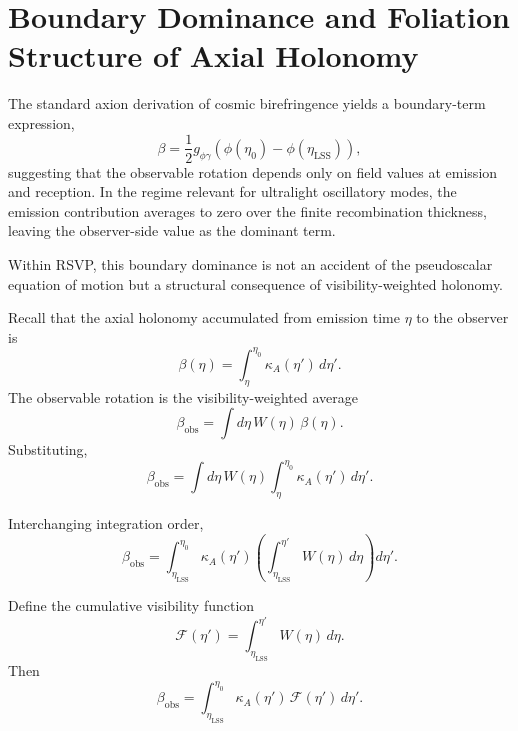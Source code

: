\documentclass[12pt]{article}
\begin{document}
\newpage
\section{Boundary Dominance and Foliation Structure of Axial Holonomy}

The standard axion derivation of cosmic birefringence yields a boundary-term expression,
\begin{equation}
\beta
=
\frac{1}{2} g_{\phi\gamma}
\left(
\phi(\eta_0) - \phi(\eta_{\mathrm{LSS}})
\right),
\end{equation}
suggesting that the observable rotation depends only on field values at emission and reception. In the regime relevant for ultralight oscillatory modes, the emission contribution averages to zero over the finite recombination thickness, leaving the observer-side value as the dominant term.

Within RSVP, this boundary dominance is not an accident of the pseudoscalar equation of motion but a structural consequence of visibility-weighted holonomy.

Recall that the axial holonomy accumulated from emission time $\eta$ to the observer is
\begin{equation}
\beta(\eta)
=
\int_{\eta}^{\eta_0}
\kappa_A(\eta')\, d\eta'.
\end{equation}
The observable rotation is the visibility-weighted average
\begin{equation}
\beta_{\mathrm{obs}}
=
\int d\eta\, W(\eta)\, \beta(\eta).
\end{equation}
Substituting,
\begin{equation}
\beta_{\mathrm{obs}}
=
\int d\eta\, W(\eta)
\int_{\eta}^{\eta_0}
\kappa_A(\eta')\, d\eta'.
\end{equation}

Interchanging integration order,
\begin{equation}
\beta_{\mathrm{obs}}
=
\int_{\eta_{\mathrm{LSS}}}^{\eta_0}
\kappa_A(\eta')
\left(
\int_{\eta_{\mathrm{LSS}}}^{\eta'} W(\eta)\, d\eta
\right)
d\eta'.
\end{equation}

Define the cumulative visibility function
\begin{equation}
\mathcal{F}(\eta')
=
\int_{\eta_{\mathrm{LSS}}}^{\eta'} W(\eta)\, d\eta.
\end{equation}
Then
\begin{equation}
\beta_{\mathrm{obs}}
=
\int_{\eta_{\mathrm{LSS}}}^{\eta_0}
\kappa_A(\eta')\, \mathcal{F}(\eta')\, d\eta'.
\end{equation}
\end{document}
